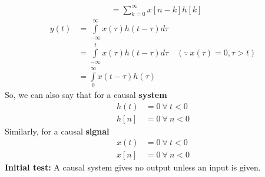 \documentclass[oneside]{book}
\begin{document}
\begin{enumerate}
\begin{align*}
		           & = \sum\limits_{k = 0}^\infty x[n-k]h[k]
	      \end{align*}
	      \begin{align*}
		      y(t) & = \int\limits_{-\infty}^{\infty} x(\tau)h(t-\tau)d\tau                                \\
		           & = \int\limits_{-\infty}^t x(\tau)h(t-\tau)d\tau\quad{(\because\ x(\tau) = 0, \tau>t)} \\
		           & = \int\limits_{0}^\infty x(t-\tau)h(\tau)
	      \end{align*}
	      So, we can also say that for a causal \textbf{system}
	      \begin{align*}
		      h(t) & = 0\ \forall\ t<0 \\
		      h[n] & = 0\ \forall\ n<0
	      \end{align*}
	      Similarly, for a causal \textbf{signal}
	      \begin{align*}
		      x(t) & = 0\ \forall\ t<0 \\
		      x[n] & = 0\ \forall\ n<0
	      \end{align*}
	      \textbf{Initial test: } A causal system gives no output unless an input is given.
\end{enumerate}



\end{document}
